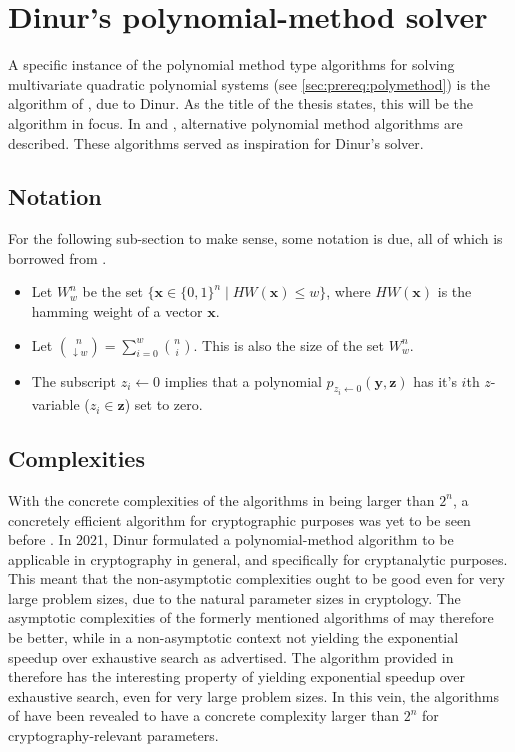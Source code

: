 \chapter{Dinur's polynomial-method solver} \label{sec:dinur}

A specific instance of the polynomial method type algorithms for solving multivariate quad\-ratic polynomial systems (see \cref{sec:prereq:polymethod}) is the algorithm of \cite{eurocrypt-2021-30841}, due to Dinur. As the title of the thesis states, this will be the algorithm in focus. In \cite{doi:10.1137/1.9781611974782.143} and \cite{Williams2014ThePM}, alternative polynomial method algorithms are described. These algorithms served as inspiration for Dinur's solver.

\section{Notation} \label{sec:dinur:notation}

For the following sub-section to make sense, some notation is due, all of which is borrowed from \cite{eurocrypt-2021-30841}.
\begin{itemize}
    \item Let $W^n_w$ be the set $\{\mathbf{x} \in \{0, 1\}^n \mid HW(\mathbf{x}) \leq w \}$, where $HW(\mathbf{x})$ is the hamming weight of a vector $\mathbf{x}$. 
    \item Let $\binom{n}{\downarrow w} = \sum^w_{i = 0} \binom{n}{i}$. This is also the size of the set $W^n_w$.
    \item The subscript $z_i \leftarrow 0$ implies that a polynomial $p_{z_i \leftarrow 0}(\mathbf{y},\mathbf{z})$ has it's $i$th $z$-variable ($z_i \in \mathbf{z}$) set to zero.
\end{itemize}

\section{Complexities}

With the concrete complexities of the algorithms in \cite{doi:10.1137/1.9781611974782.143, Williams2014ThePM} being larger than $2^n$, a concretely efficient algorithm for cryptographic purposes was yet to be seen before \cite{eurocrypt-2021-30841}. In 2021, Dinur formulated a polynomial-method algorithm to be applicable in cryptography in general, and specifically for cryptanalytic purposes. This meant that the non-asymptotic complexities ought to be good even for very large problem sizes, due to the natural parameter sizes in cryptology. The asymptotic complexities of the formerly mentioned algorithms of \cite{doi:10.1137/1.9781611974782.143, Williams2014ThePM} may therefore be better, while in a non-asymptotic context not yielding the exponential speedup over exhaustive search as advertised. The algorithm provided in \cite{eurocrypt-2021-30841} therefore has the interesting property of yielding exponential speedup over exhaustive search, even for very large problem sizes. In this vein, the algorithms of \cite{doi:10.1137/1.9781611974782.143, Williams2014ThePM} have been revealed to have a concrete complexity larger than $2^n$ for cryptography-relevant parameters.


